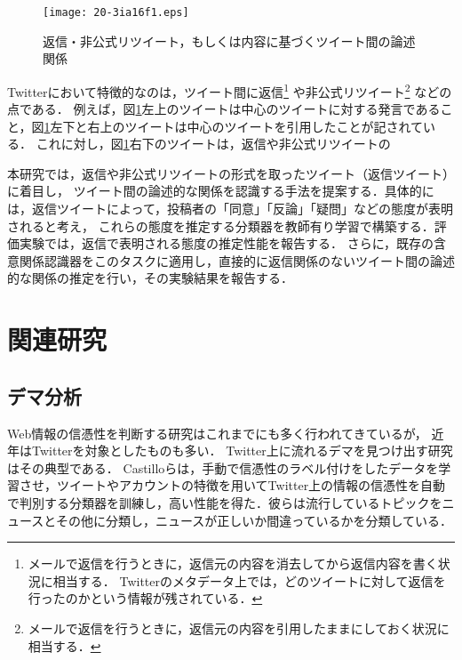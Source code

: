 \documentclass[japanese]{jnlp_1.4}
\newcommand{\addspan}[1]{}
\begin{document}
\begin{figure}[t]
  \begin{center}
   \texttt{[image: 20-3ia16f1.eps]}
  \end{center}
  \caption{返信・非公式リツイート，もしくは内容に基づくツイート間の論述関係}
  \label{fig:map}
\vspace{-0.5\Cvs}
\end{figure}

Twitterにおいて特徴的なのは，ツイート間に返信\footnote{メールで返信を行うときに，返信元の内容を消去してから返信内容を書く状況に相当する．
Twitterのメタデータ上では，どのツイートに対して返信を行ったのかという情報が残されている．}
や非公式リツイート\footnote{メールで返信を行うときに，返信元の内容を引用したままにしておく状況に相当する．
\addspan{元のツイートをそのままの形でフォロワーに送る
（公式）リツイートとは異なりTwitterが提供している機能ではないが，サードパーティ製のクライアントでサポートされており頻繁に利用されている．}}
などの\addspan{形式を取った投稿が可能な}点である．
例えば，図\ref{fig:map}左上のツイートは中心のツイートに対する発言であること，図\ref{fig:map}左下と右上のツイートは中心のツイートを引用したことが記されている．
これに対し，図\ref{fig:map}右下のツイートは，返信や非公式リツイートの
\addspan{形式を取っていないため，中心のツイートを見て投稿されたものかは不明である．}

本研究では，返信や非公式リツイートの形式を取ったツイート（返信ツイート）に着目し，
ツイート間の論述的な関係を認識する手法を提案する．具体的には，返信ツイートによって，投稿者の「同意」「反論」「疑問」などの態度が表明されると考え，
これらの態度を推定する分類器を教師有り学習で構築する．評価実験では，返信で表明される態度の推定性能を報告する．
さらに，既存の含意関係認識器をこのタスクに適用し，直接的に返信関係のないツイート間の論述的な関係の推定を行い，その実験結果を報告する．



\section{関連研究}\label{sec:Related}

\subsection{デマ分析}

Web情報の信憑性を判断する研究はこれまでにも多く行われてきているが，
近年はTwitterを対象としたものも多い．
Twitter上に流れるデマを見つけ出す研究はその典型である．
Castilloら\cite{Castillo_2011}は，手動で信憑性のラベル付けをしたデータを学習させ，ツイートやアカウントの特徴を用いてTwitter上の情報の信憑性を自動で判別する分類器を訓練し，高い性能を得た．彼らは流行しているトピックをニュースとその他に分類し，ニュースが正しいか間違っているかを分類している．
\end{document}
